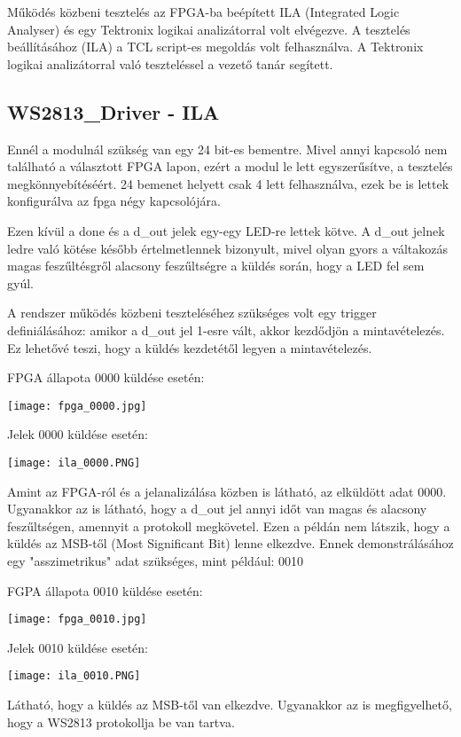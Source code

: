 \tab Működés közbeni tesztelés az FPGA-ba beépített ILA (Integrated Logic Analyser) és egy Tektronix logikai analizátorral volt elvégezve. A tesztelés beállításához (ILA) a TCL script-es megoldás\cite{brassai2018ukda_ila} volt felhasználva.
A Tektronix logikai analizátorral való teszteléssel a vezető tanár segített.

\subsection{WS2813\_Driver - ILA}

\tab Ennél a modulnál szükség van egy 24 bit-es bementre. Mivel annyi kapcsoló nem található a választott FPGA lapon, ezért a modul le lett egyszerűsítve, a tesztelés megkönnyebítéséért. 
24 bemenet helyett csak 4 lett felhasználva, ezek be is lettek konfigurálva az fpga négy kapcsolójára.

\tab Ezen kívül a done és a d\_out jelek egy-egy LED-re lettek kötve. A d\_out jelnek ledre való kötése később értelmetlennek bizonyult, mivel olyan gyors a váltakozás magas feszűltésgről alacsony feszűltségre
a küldés során, hogy a LED fel sem gyúl.

\tab A rendszer működés közbeni teszteléséhez szükséges volt egy trigger definiálásához: amikor a d\_out jel 1-esre vált, akkor kezdődjön a mintavételezés. Ez lehetővé teszi, hogy a küldés kezdetétől legyen a mintavételezés.

\tab FPGA állapota 0000 küldése esetén:

\texttt{[image: fpga\_0000.jpg]}

\tab Jelek 0000 küldése esetén:

\texttt{[image: ila\_0000.PNG]}

\tab Amint az FPGA-ról és a jelanalizálása közben is látható, az elküldött adat 0000. Ugyanakkor az is látható, hogy a d\_out jel annyi időt van magas és alacsony feszűltségen, amennyit a protokoll megkövetel.
Ezen a példán nem látszik, hogy a küldés az MSB-től (Most Significant Bit) lenne elkezdve. Ennek demonstrálásához egy "asszimetrikus" adat szükséges, mint például: 0010

\tab FGPA állapota 0010 küldése esetén:

\texttt{[image: fpga\_0010.jpg]}

\tab Jelek 0010 küldése esetén:

\texttt{[image: ila\_0010.PNG]}

\tab Látható, hogy a küldés az MSB-től van elkezdve. Ugyanakkor az is megfigyelhető, hogy a WS2813 protokollja be van tartva.

